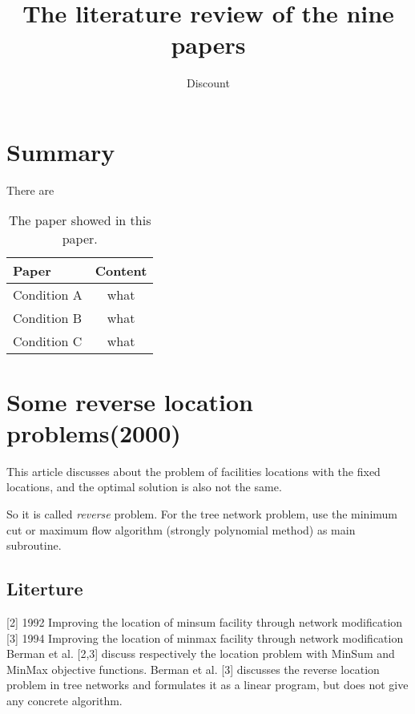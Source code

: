 \documentclass[UTF8]{article}
\title{The literature review of the nine papers}
\author{Dis\cdot count}
\begin{document}
\maketitle{}

\section{Summary}

There are



\begin{table}[ht]

\tabcolsep=70pt

\small\renewcommand{}

\caption{The paper showed in this paper.\label{tab:1}}

{\begin{tabular}{lc}
\hline
Paper & Content \\
\hline
Condition A & what \\
\hline
Condition B & what \\
\hline
Condition C & what \\
\hline
\end{tabular}}
{}
\end{table}


\section{Some reverse location problems(2000)}

This article discusses about the problem of facilities locations with the fixed locations, and the optimal solution is also not the same.

So it is called \emph{reverse} problem. For the tree network problem, use the minimum cut or maximum flow algorithm (strongly polynomial method) as main subroutine.

\subsection{Literture}

[2] 1992 Improving the location of minsum facility through network modification
[3] 1994 Improving the location of minmax facility through network modification
Berman et al. [2,3] discuss respectively the location problem with MinSum and MinMax objective functions.
Berman et al. [3] discusses the reverse location problem in tree networks and formulates it as a linear program, but does not give any concrete algorithm.
\end{document}
